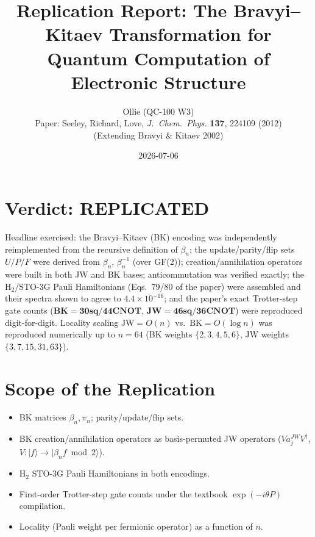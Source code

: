 \documentclass[11pt]{article}
\title{Replication Report: The Bravyi--Kitaev Transformation for Quantum Computation of Electronic Structure}
\author{Ollie (QC-100 W3) \\ Paper: Seeley, Richard, Love, \emph{J.\ Chem.\ Phys.} \textbf{137}, 224109 (2012) \\ (Extending Bravyi \& Kitaev 2002)}
\date{2026-07-06}
\begin{document}
\maketitle

\section*{Verdict: REPLICATED}
Headline exercised: the Bravyi--Kitaev (BK) encoding was independently reimplemented from
the recursive definition of $\beta_n$; the update/parity/flip sets $U/P/F$ were derived from
$\beta_n$, $\beta_n^{-1}$ (over GF(2)); creation/annihilation operators were built in both
JW and BK bases; anticommutation was verified exactly; the H$_2$/STO-3G Pauli Hamiltonians
(Eqs.~79/80 of the paper) were assembled and their spectra shown to agree to $4.4\times10^{-16}$;
and the paper's exact Trotter-step gate counts ($\mathbf{BK{=}30\text{sq}/44\text{CNOT}}$,
$\mathbf{JW{=}46\text{sq}/36\text{CNOT}}$) were reproduced digit-for-digit. Locality scaling
$\text{JW}=O(n)$ vs.\ $\text{BK}=O(\log n)$ was reproduced numerically up to $n{=}64$
(BK weights $\{2,3,4,5,6\}$, JW weights $\{3,7,15,31,63\}$).

\section{Scope of the Replication}
\begin{itemize}
  \item BK matrices $\beta_n,\pi_n$; parity/update/flip sets.
  \item BK creation/annihilation operators as basis-permuted JW operators
        ($V a_j^{JW} V^\dagger$, $V\!:\!|f\rangle\!\to\!|\beta_n f\bmod 2\rangle$).
  \item H$_2$ STO-3G Pauli Hamiltonians in both encodings.
  \item First-order Trotter-step gate counts under the textbook
        $\exp(-i\theta P)$ compilation.
  \item Locality (Pauli weight per fermionic operator) as a function of $n$.
\end{itemize}
\end{document}

